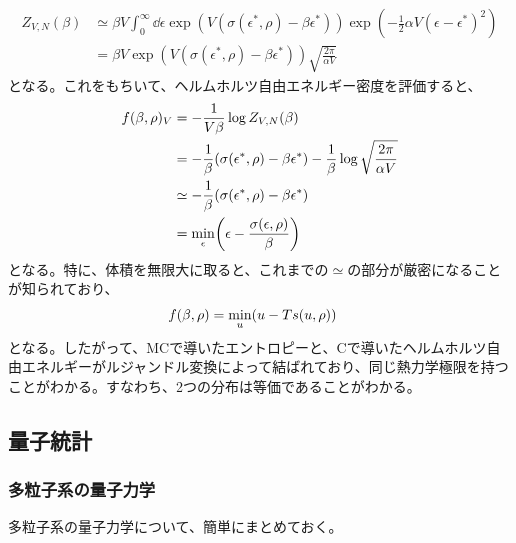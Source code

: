 \documentclass[a4paper,11pt]{jsarticle}
\numberwithin{equation}{section}
\begin{document}
\begin{align}
  Z_{V,N}(\beta) &\simeq \beta V \int_{0}^{\infty}\dd \epsilon \exp(V(\sigma(\epsilon^{*},\rho)-\beta \epsilon^{*})) \exp(-\frac{1}{2}\alpha V(\epsilon-\epsilon^{*})^2)\\
  &= \beta V \exp(V(\sigma(\epsilon^{*},\rho)-\beta \epsilon^{*}))\sqrt{\frac{2\pi}{\alpha V}}
\end{align}
となる。これをもちいて、ヘルムホルツ自由エネルギー密度を評価すると、
\begin{align}
  f(\beta,\rho)_V &= -\frac{1}{V\beta}\log Z_{V,N}(\beta)\\
  &= -\frac{1}{\beta}(\sigma(\epsilon^{*},\rho) -\beta \epsilon^{*} ) -\frac{1}{\beta}\log \sqrt{\frac{2\pi}{\alpha V}}\\
  &\simeq -\frac{1}{\beta}(\sigma(\epsilon^{*},\rho) -\beta \epsilon^{*} ) \\
  &= \underset{\epsilon}{\min} \qty(\epsilon - \frac{\sigma(\epsilon,\rho)}{\beta})
\end{align}
となる。特に、体積を無限大に取ると、これまでの$\simeq$の部分が厳密になることが知られており、
\begin{align}
  f(\beta,\rho) &= \underset{u}{\min} \qty(u - Ts(u,\rho))
\end{align}
となる。したがって、MCで導いたエントロピーと、Cで導いたヘルムホルツ自由エネルギーがルジャンドル変換によって結ばれており、同じ熱力学極限を持つことがわかる。すなわち、2つの分布は等価であることがわかる。\hfill\qedsymbol\\







\subsection{量子統計}
\subsubsection{多粒子系の量子力学}
多粒子系の量子力学について、簡単にまとめておく。\\
\end{document}

